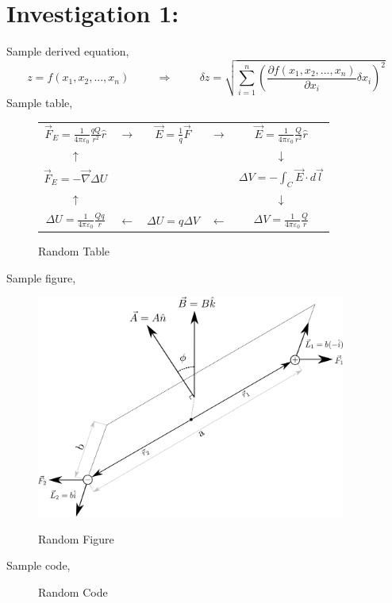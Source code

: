 \documentclass[12pt,a4paper]{article}
\begin{document}
	\section*{Investigation 1:}	
		Sample derived equation,
		\[ z = f(x_1,x_2,...,x_n) 
		\hspace{1cm} \Rightarrow \hspace{1cm}
		\delta z = \sqrt{\sum_{i=1}^n \left(
		\frac{\partial f(x_1,x_2,...,x_n)}{\partial x_i} \delta x_i \right)^2 }\]
		Sample table,
		\begin{figure}[H]
			\centering
			\begin{tabular}{ccccc}
				\(\displaystyle \vec{F}_E = \frac{1}{4 \pi \varepsilon_0} \frac{qQ}{r^2} \hat{r} \) &
				$\rightarrow$ & 
				$\displaystyle \vec{E} = \frac{1}{q} \vec{F}$ & 
				$\rightarrow$ &
				\(\displaystyle \vec{E} = \frac{1}{4 \pi \varepsilon_0} \frac{Q}{r^2} \hat{r} \)\\
				$\uparrow$ & & & & $\downarrow$\\
				\(\displaystyle \vec{F}_E = - \vec{\nabla} \Delta U\) & & & &
				\(\displaystyle \Delta V = - \int_C \vec{E} \cdot d\vec{l}\)\\
				$\uparrow$ & & & & $\downarrow$\\
				\(\displaystyle \Delta U = \frac{1}{4 \pi \varepsilon_0} \frac{Qq}{r} \) &
				$\leftarrow$ & 
				$\Delta U = q \Delta V$ & 
				$\leftarrow$ &
				\(\displaystyle \Delta V = \frac{1}{4 \pi \varepsilon_0} \frac{Q}{r} \)
			\end{tabular}
			\caption{Random Table}
		\end{figure} \noindent
		Sample figure,
		\begin{figure}[H]
			\centering
			\includegraphics[width=4in]{RandFigure}\\
			\caption{Random Figure}
		\end{figure} \noindent
		Sample code,
		\begin{figure}[H]
			
			\centering
			\caption{Random Code}
		\end{figure}
		
\end{document}
